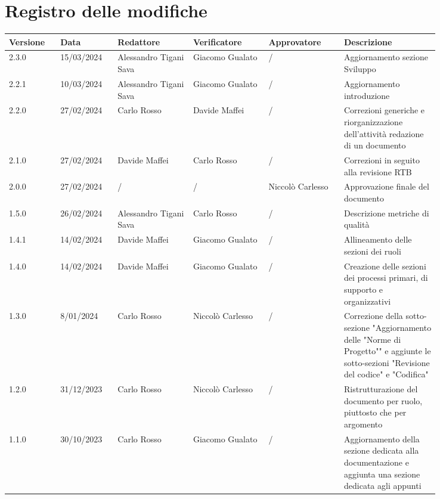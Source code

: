 \section*{Registro delle modifiche}
 {
  \scriptsize
  \begin{longtable}{p{0.10\linewidth}p{0.10\linewidth}p{0.15\linewidth}p{0.15\linewidth}p{0.15\linewidth}p{0.19\linewidth}}
	  \textbf{Versione} & \textbf{Data} & \textbf{Redattore}     & \textbf{Verificatore} & \textbf{Approvatore} & \textbf{Descrizione}	\\
	  \toprule
	  2.3.0	& 15/03/2024    & Alessandro Tigani Sava & Giacomo Gualato	& /					& Aggiornamento sezione Sviluppo	\\
	  \hline
	  2.2.1	& 10/03/2024    & Alessandro Tigani Sava & Giacomo Gualato	& /					& Aggiornamento introduzione	\\
	  \hline
	  2.2.0	& 27/02/2024    & Carlo Rosso            & Davide Maffei	& /					& Correzioni generiche e riorganizzazione dell'attività redazione di un documento	\\
	  \hline
	  2.1.0	& 27/02/2024    & Davide Maffei          & Carlo Rosso		& /					& Correzioni in seguito alla revisione RTB                                                                                                 \\
	  \hline
	  2.0.0	& 27/02/2024    & /                      & /				& Niccolò Carlesso	& Approvazione finale del documento	\\
	  \hline
	  1.5.0	& 26/02/2024    & Alessandro Tigani Sava & Carlo Rosso		& /					& Descrizione metriche di qualità	\\
	  \hline
	  1.4.1	& 14/02/2024    & Davide Maffei          & Giacomo Gualato	& /					& Allineamento delle sezioni dei ruoli	\\
	  \hline
	  1.4.0	& 14/02/2024    & Davide Maffei          & Giacomo Gualato	& /					& Creazione delle sezioni dei processi primari, di supporto e organizzativi	\\
	  \hline
	  1.3.0	& 8/01/2024     & Carlo Rosso            & Niccolò Carlesso	& /					& Correzione della sotto-sezione "Aggiornamento delle "Norme di Progetto"" e aggiunte le sotto-sezioni "Revisione del codice" e "Codifica" \\
	  \hline
	  1.2.0	& 31/12/2023    & Carlo Rosso            & Niccolò Carlesso	& /					& Ristrutturazione del documento per ruolo, piuttosto che per argomento	\\
	  \hline
	  1.1.0	& 30/10/2023    & Carlo Rosso            & Giacomo Gualato	& /					& Aggiornamento della sezione dedicata alla documentazione e aggiunta una sezione dedicata agli appunti	\\

\end{longtable}}
